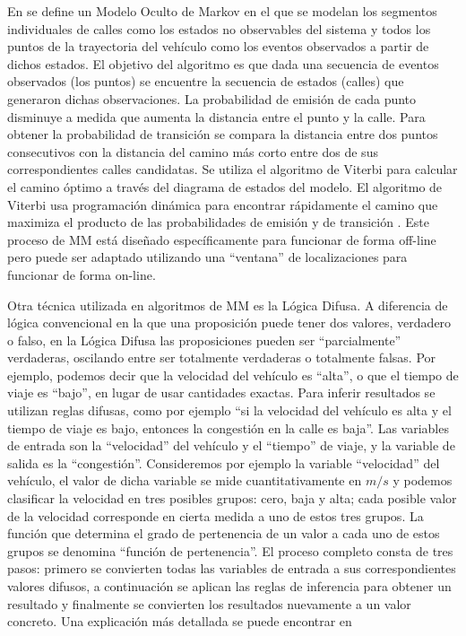 En \cite{newson2009hidden} se define un Modelo Oculto de Markov en el que se modelan los segmentos individuales de calles como los estados no observables del sistema y todos los puntos de la trayectoria del vehículo como los eventos observados a partir de dichos estados. El objetivo del algoritmo es que dada una secuencia de eventos observados (los puntos) se encuentre la secuencia de estados (calles) que generaron dichas observaciones. La probabilidad de emisión de cada punto disminuye a medida que aumenta la distancia entre el punto y la calle. Para obtener la probabilidad de transición se compara la distancia entre dos puntos consecutivos con la distancia del camino más corto entre dos de sus correspondientes calles candidatas. Se utiliza el algoritmo de Viterbi para calcular el camino óptimo a través del diagrama de estados del modelo. El algoritmo de Viterbi usa programación dinámica para encontrar rápidamente el camino que maximiza el producto de las probabilidades de emisión y de transición \cite{forney1973viterbi}. Este proceso de MM está diseñado específicamente para funcionar de forma off-line pero puede ser adaptado utilizando una “ventana” de localizaciones para funcionar de forma on-line.

Otra técnica utilizada en algoritmos de MM es la Lógica Difusa. A diferencia de lógica convencional en la que una proposición puede tener dos valores, verdadero o falso, en la Lógica Difusa las proposiciones pueden ser “parcialmente” verdaderas, oscilando entre ser totalmente verdaderas o totalmente falsas. Por ejemplo, podemos decir que la velocidad del vehículo es “alta”, o que el tiempo de viaje es “bajo”, en lugar de usar cantidades exactas. Para inferir resultados se utilizan reglas difusas, como por ejemplo “si la velocidad del vehículo es alta y el tiempo de viaje es bajo, entonces la congestión en la calle es baja”. Las variables de entrada son la “velocidad” del vehículo y el “tiempo” de viaje, y la variable de salida es la “congestión”. Consideremos por ejemplo la variable “velocidad” del vehículo, el valor de dicha variable se mide cuantitativamente en $m/s$ y podemos clasificar la velocidad en tres posibles grupos: cero, baja y alta; cada posible valor de la velocidad corresponde en cierta medida a uno de estos tres grupos. La función  que determina el grado de pertenencia de un valor a cada uno de estos grupos se denomina “función de pertenencia”. El proceso completo consta de tres pasos: primero se convierten todas las variables de entrada a sus correspondientes valores difusos, a continuación se aplican las reglas de inferencia para obtener un resultado y finalmente se convierten los resultados nuevamente a un valor concreto. Una explicación más detallada se puede encontrar en \cite{zadeh1988fuzzy}

